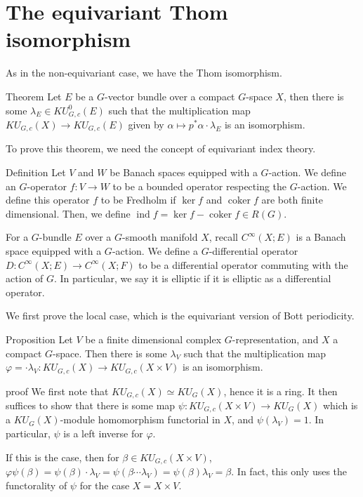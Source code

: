 \documentclass{beamer}
\DeclareMathOperator{\coker}{\mathrm{coker}}
\DeclareMathOperator{\ind}{\mathrm{ind}}
\begin{document}
\section{The equivariant Thom isomorphism}

\begin{frame}
	As in the non-equivariant case, we have the Thom isomorphism. 
	\begin{alertblock}{Theorem}
		Let $E$ be a $G$-vector bundle over a compact $G$-space $X$, then there is some $\lambda_E\in KU_{G,c}^0(E)$ such that the multiplication map $KU_{G,c}(X)\to KU_{G,c}(E)$ given by $\alpha\mapsto p^*\alpha\cdot\lambda_E$ is an isomorphism. 
	\end{alertblock}
	To prove this theorem, we need the concept of equivariant index theory. 
\end{frame}

\begin{frame}
	\begin{block}{Definition}
		Let $V$ and $W$ be Banach spaces equipped with a $G$-action. We define an $G$-operator $f:V\to W$ to be a bounded operator respecting the $G$-action. We define this operator $f$ to be Fredholm if $\ker f$ and $\coker f$ are both finite dimensional. Then, we define $\ind f=\ker f-\coker f\in R(G)$. 
		
		For a $G$-bundle $E$ over a $G$-smooth manifold $X$, recall $C^\infty(X;E)$ is a Banach space equipped with a $G$-action. We define a $G$-differential operator $D:C^\infty(X;E)\to C^\infty(X;F)$ to be a differential operator commuting with the action of $G$. In particular, we say it is elliptic if it is elliptic as a differential operator. 
	\end{block}
\end{frame}

\begin{frame}
	We first prove the local case, which is the equivariant version of Bott periodicity. 
	\begin{block}{Proposition}
		Let $V$ be a finite dimensional complex $G$-representation, and $X$ a compact $G$-space. Then there is some $\lambda_V$ such that the multiplication map $\varphi=\cdot\lambda_V:KU_{G,c}(X)\to KU_{G,c}(X\times V)$ is an isomorphism. 
	\end{block}
	\begin{block}{proof}
		We first note that $KU_{G,c}(X)\simeq KU_G(X)$, hence it is a ring. It then suffices to show that there is some map $\psi:KU_{G,c}(X\times V)\to KU_G(X)$ which is a $KU_G(X)$-module homomorphism functorial in $X$, and $\psi(\lambda_V)=1$. In particular, $\psi$ is a left inverse for $\varphi$. 

		If this is the case, then for $\beta\in KU_{G,c}(X\times V)$, $\varphi\psi(\beta)=\psi(\beta)\cdot\lambda_V=\psi(\beta\cdots\lambda_V)=\psi(\beta)\lambda_V=\beta$. In fact, this only uses the functorality of $\psi$ for the case $X=X\times V$. 
	\end{block}
\end{frame}
\end{document}
